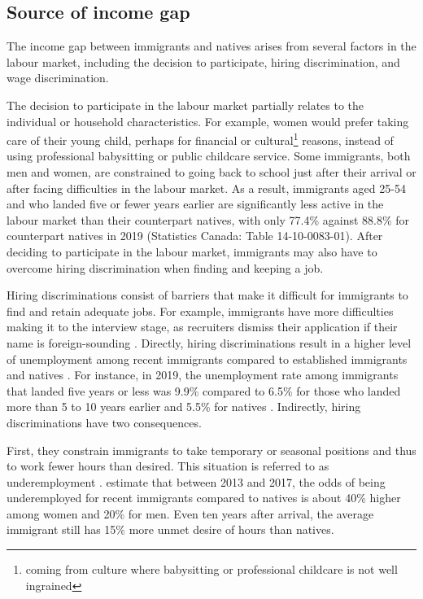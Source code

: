 \subsection{Source of income gap}
The income gap between immigrants and natives arises from several factors in the labour market, including the decision to participate, hiring discrimination, and wage discrimination.

\vspace{0.7em}\par
The decision to participate in the labour market partially relates to the individual or household characteristics.
For example, women would prefer taking care of their young child, perhaps for financial or cultural\footnote{coming from culture where babysitting or professional childcare is not well ingrained} reasons, instead of using professional babysitting or public childcare service.
Some immigrants, both men and women, are constrained to going back to school just after their arrival or after facing difficulties in the labour market.
As a result, immigrants aged 25-54 and who landed five or fewer years earlier are significantly less active in the labour market than their counterpart natives, with only 77.4\% against 88.8\% for counterpart natives in 2019 (Statistics Canada: Table 14-10-0083-01).
After deciding to participate in the labour market, immigrants may also have to overcome hiring discrimination when finding and keeping a job.

\vspace{0.7em}\par
Hiring discriminations consist of barriers that make it difficult for immigrants to find and retain adequate jobs.
For example, immigrants have more difficulties making it to the interview stage, as recruiters dismiss their application if their name is foreign-sounding \citep{Crandall:wo,ROOTH2010523,Oreopoulos:2011jv}.
Directly, hiring discriminations result in a higher level of unemployment among recent immigrants compared to established immigrants and natives \citep{Oreopoulos:2011jv}.
For instance, in 2019, the unemployment rate among immigrants that landed five years or less was 9.9\% compared to 6.5\% for those who landed more than 5 to 10 years earlier and 5.5\% for natives \citep{statCan:002}.
Indirectly, hiring discriminations have two consequences.

\vspace{0.7em}\par
First, they constrain immigrants to take temporary or seasonal positions and thus to work fewer hours than desired.
This situation is referred to as underemployment \citep{ilo:2013icls,gilbert:2022b,Mitchell:2008wo,CanadianLabourCongress:2014wi}.
\citet{gilbert:2022b} estimate that between 2013 and 2017, the odds of being underemployed for recent immigrants compared to natives is about 40\% higher among women and 20\% for men.
Even ten years after arrival, the average immigrant still has 15\% more unmet desire of hours than natives.

